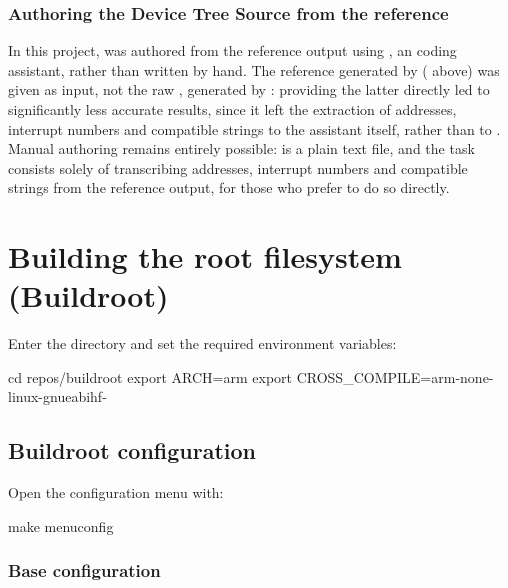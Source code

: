 \subsubsection{Authoring the Device Tree Source from the reference}

In this project,  was authored from the  reference output using , an  coding assistant, rather than written by hand. The reference  generated by  ( above) was given as input, not the raw , generated by : providing the latter directly led to significantly less accurate results, since it left the extraction of addresses, interrupt numbers and compatible strings to the  assistant itself, rather than to . Manual authoring remains entirely possible:  is a plain text file, and the task consists solely of transcribing addresses, interrupt numbers and compatible strings from the reference output, for those who prefer to do so directly.

\section{Building the root filesystem (Buildroot)}
\label{sec:fpgalix-buildroot}

Enter the  directory and set the required environment variables:

\begin{shellcodehost}
cd repos/buildroot
export ARCH=arm
export CROSS_COMPILE=arm-none-linux-gnueabihf-
\end{shellcodehost}

\subsection{Buildroot configuration}
\label{subsec:fpgalix-buildroot-config}

Open the configuration menu with:

\begin{shellcodehost}
make menuconfig
\end{shellcodehost}

\subsubsection{Base configuration}
\label{subsec:fpgalix-buildroot-base}

